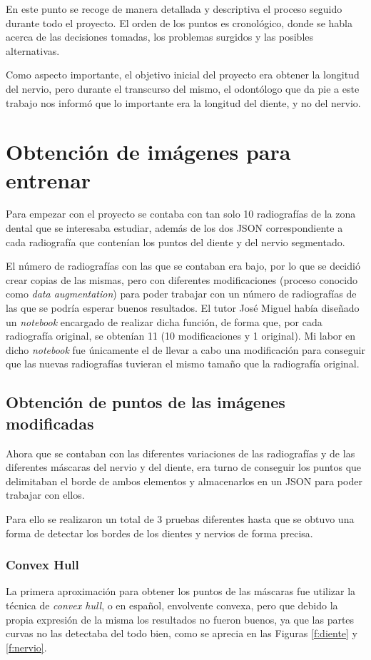 
En este punto se recoge de manera detallada y descriptiva el proceso seguido durante todo el proyecto. El orden de los puntos es cronológico, donde se habla acerca de las decisiones tomadas, los problemas surgidos y las posibles alternativas. 

Como aspecto importante, el objetivo inicial del proyecto era obtener la longitud del nervio, pero durante el transcurso del mismo, el odontólogo que da pie a este trabajo nos informó que lo importante era la longitud del diente, y no del nervio.

\section{Obtención de imágenes para entrenar}
Para empezar con el proyecto se contaba con tan solo 10 radiografías de la zona dental que se interesaba estudiar, además de los dos JSON correspondiente a cada radiografía que contenían los puntos del diente y del nervio segmentado.

El número de radiografías con las que se contaban era bajo, por lo que se decidió crear copias de las mismas, pero con diferentes modificaciones (proceso conocido como \emph{data augmentation}) para poder trabajar con un número de radiografías de las que se podría esperar buenos resultados. El tutor José Miguel había diseñado un \emph{notebook} encargado de realizar dicha función, de forma que, por cada radiografía original, se obtenían 11 (10 modificaciones y 1 original). Mi labor en dicho \emph{notebook} fue únicamente el de llevar a cabo una modificación para conseguir que las nuevas radiografías tuvieran el mismo tamaño que la radiografía original.

\subsection{Obtención de puntos de las imágenes modificadas}
Ahora que se contaban con las diferentes variaciones de las radiografías y de las diferentes máscaras del nervio y del diente, era turno de conseguir los puntos que delimitaban el borde de ambos elementos y almacenarlos en un JSON para poder trabajar con ellos.

Para ello se realizaron un total de 3 pruebas diferentes hasta que se obtuvo una forma de detectar los bordes de los dientes y nervios de forma precisa.

\subsubsection{Convex Hull}
La primera aproximación para obtener los puntos de las máscaras fue utilizar la técnica de \emph{convex hull}, o en español, envolvente convexa, pero que debido la propia expresión de la misma los resultados no fueron buenos, ya que las partes curvas no las detectaba del todo bien, como se aprecia en las Figuras \ref{f:diente} y \ref{f:nervio}.

